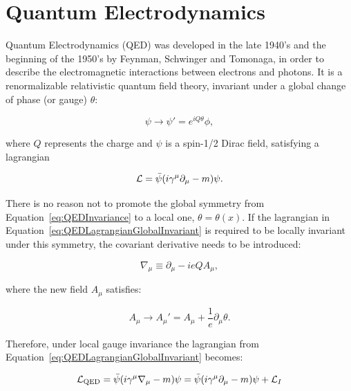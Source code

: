 \section{Quantum Electrodynamics}
    \label{sec:QED}

Quantum Electrodynamics (QED) was developed in the late 1940's and the beginning of the 1950's by Feynman, Schwinger and Tomonaga, in order to describe the electromagnetic interactions between electrons and photons.
It is a renormalizable relativistic quantum field theory, invariant under a global change of phase (or gauge) $\theta$:

\begin{equation}
\psi \rightarrow \psi' = e^{iQ\theta} \phi,
\label{eq:QEDInvariance}
\end{equation}

\noindent where $Q$ represents the charge and $\psi$ is a spin-1/2 Dirac field, satisfying a lagrangian

\begin{equation}
\lagrangian = \bar{\psi}(i\gamma^{\mu}\partial_\mu -m)\psi.
\label{eq:QEDLagrangianGlobalInvariant}
\end{equation}

There is no reason not to promote the global symmetry from Equation~\ref{eq:QEDInvariance} to a local one, $\theta = \theta(x)$.
If the lagrangian in Equation~\ref{eq:QEDLagrangianGlobalInvariant} is required to be locally invariant under this symmetry, the covariant derivative needs to be introduced:

\begin{equation}
\nabla_\mu \equiv \partial_\mu - ieQA_\mu,
\label{eq:QEDCovariantDerivative}
\end{equation}

\noindent where the new field $A_\mu$ satisfies:

\begin{equation}
A_\mu \rightarrow A_\mu' = A_\mu + \frac{1}{e}\partial_\mu \theta.
\label{eq:QEDPhotonTransformation}
\end{equation}

Therefore, under local gauge invariance the lagrangian from Equation~\ref{eq:QEDLagrangianGlobalInvariant} becomes:

\begin{equation}
\lagrangian_{\text{QED}} = \bar{\psi}(i\gamma^{\mu}\nabla_\mu -m)\psi = \bar{\psi}(i\gamma^{\mu}\partial_\mu -m)\psi + \lagrangian_I
\label{eq:QEDLagrangianLocalInvariant}
\end{equation}


